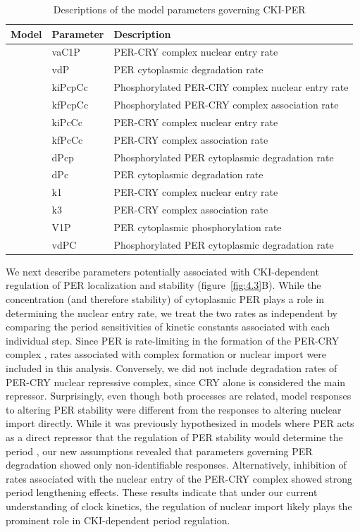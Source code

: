 \begin{table}[p]
\caption{Descriptions of the model parameters governing CKI-PER}
\label{tab:4.2}
\centering
\begin{tabular}{llp{10cm}}\toprule
Model              & Parameter & Description \\\midrule
\cite{Hirota2012}  & vaC1P   & PER-CRY complex nuclear entry rate \\
                   & vdP     & PER cytoplasmic degradation rate \\\midrule
\cite{Relogio2011} & kiPcpCc & Phosphorylated PER-CRY complex nuclear entry rate \\
                   & kfPcpCc & Phosphorylated PER-CRY complex association rate \\
                   & kiPcCc  & PER-CRY complex nuclear entry rate \\
                   & kfPcCc  & PER-CRY complex association rate \\
                   & dPcp    & Phosphorylated PER cytoplasmic degradation rate \\
                   & dPc     & PER cytoplasmic degradation rate \\\midrule
\cite{Leloup2003}  & k1      & PER-CRY complex nuclear entry rate \\
                   & k3      & PER-CRY complex association rate \\
                   & V1P     & PER cytoplasmic phosphorylation rate \\
                   & vdPC    & Phosphorylated PER cytoplasmic degradation rate \\\bottomrule
\end{tabular}
\end{table}

We next describe parameters potentially associated with CKI-dependent regulation of PER localization and stability (figure~\ref{fig:4.3}B). 
While the concentration (and therefore stability) of cytoplasmic PER plays a role in determining the nuclear entry rate, we treat the two rates as independent by comparing the period sensitivities of kinetic constants associated with each individual step. 
Since PER is rate-limiting in the formation of the PER-CRY complex \cite{Lee2001}, rates associated with complex formation or nuclear import were included in this analysis. 
Conversely, we did not include degradation rates of PER-CRY nuclear repressive complex, since CRY alone is considered the main repressor. 
Surprisingly, even though both processes are related, model responses to altering PER stability were different from the responses to altering nuclear import directly. 
While it was previously hypothesized in models where PER acts as a direct repressor that the regulation of PER stability would determine the period \cite{Gallego2006, Vanselow2006}, our new assumptions revealed that parameters governing PER degradation showed only non-identifiable responses. 
Alternatively, inhibition of rates associated with the nuclear entry of the PER-CRY complex showed strong period lengthening effects. 
These results indicate that under our current understanding of clock kinetics, the regulation of nuclear import likely plays the prominent role in CKI-dependent period regulation.

